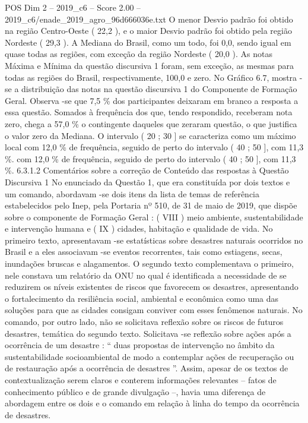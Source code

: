 \begin{textsample}{POS Dim 2 – 2019\_c6 – Score 2.00 – 2019\_c6/enade\_2019\_agro\_96d666036e.txt}
O menor Desvio padrão foi obtido na região Centro-Oeste ( 22,2 ), e o maior Desvio padrão foi obtido pela região Nordeste ( 29,3 ).
A Mediana do Brasil, como um todo, foi 0,0, sendo igual em quase todas as regiões, com exceção da região Nordeste ( 20,0 ).
As notas Máxima e Mínima da questão discursiva 1 foram, sem exceção, as mesmas para todas as regiões do Brasil, respectivamente, 100,0 e zero.
No Gráfico 6.7, mostra -se a distribuição das notas na questão discursiva 1 do Componente de Formação Geral.
Observa -se que 7,5 \% dos participantes deixaram em branco a resposta a essa questão.
Somados à frequência dos que, tendo respondido, receberam nota zero, chega a 57,0 \% o contingente daqueles que zeraram questão, o que justifica o valor zero da Mediana.
O intervalo ( 20 ; 30 ] se caracteriza como um máximo local com 12,0 \% de frequência, seguido de perto do intervalo ( 40 ; 50 ], com 11,3 \%. com 12,0 \% de frequência, seguido de perto do intervalo ( 40 ; 50 ], com 11,3 \%. 6.3.1.2 Comentários sobre a correção de Conteúdo das respostas à Questão Discursiva 1 No enunciado da Questão 1, que era constituída por dois textos e um comando, abordavam -se dois itens da lista de temas de referência estabelecidos pelo Inep, pela Portaria nº 510, de 31 de maio de 2019, que dispõe sobre o componente de Formação Geral : ( VIII ) meio ambiente, sustentabilidade e intervenção humana e ( IX ) cidades, habitação e qualidade de vida.
No primeiro texto, apresentavam -se estatísticas sobre desastres naturais ocorridos no Brasil e a eles associavam -se eventos recorrentes, tais como estiagens, secas, inundações bruscas e alagamentos.
O segundo texto complementava o primeiro, nele constava um relatório da ONU no qual é identificada a necessidade de se reduzirem os níveis existentes de riscos que favorecem os desastres, apresentando o fortalecimento da resiliência social, ambiental e econômica como uma das soluções para que as cidades consigam conviver com esses fenômenos naturais.
No comando, por outro lado, não se solicitava reflexão sobre os riscos de futuros desastres, temática do segundo texto.
Solicitava -se reflexão sobre ações após a ocorrência de um desastre : “ duas propostas de intervenção no âmbito da sustentabilidade socioambiental de modo a contemplar ações de recuperação ou de restauração após a ocorrência de desastres ”.
Assim, apesar de os textos de contextualização serem claros e conterem informações relevantes – fatos de conhecimento público e de grande divulgação –, havia uma diferença de abordagem entre os dois e o comando em relação à linha do tempo da ocorrência de desastres.

\end{textsample}

